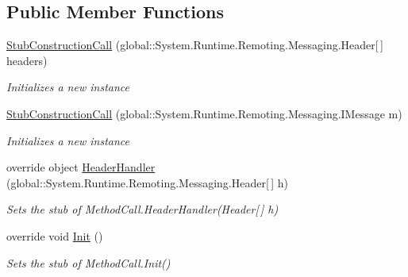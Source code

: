 \subsection*{Public Member Functions}
\begin{DoxyCompactItemize}
\item 
\hyperlink{class_system_1_1_runtime_1_1_remoting_1_1_messaging_1_1_fakes_1_1_stub_construction_call_a2eeccccc37f384931091f3d7a3b4d0d0}{Stub\-Construction\-Call} (global\-::\-System.\-Runtime.\-Remoting.\-Messaging.\-Header\mbox{[}$\,$\mbox{]} headers)
\begin{DoxyCompactList}\small\item\em Initializes a new instance\end{DoxyCompactList}\item 
\hyperlink{class_system_1_1_runtime_1_1_remoting_1_1_messaging_1_1_fakes_1_1_stub_construction_call_a7a16b830debff49f64697e7c4ea675eb}{Stub\-Construction\-Call} (global\-::\-System.\-Runtime.\-Remoting.\-Messaging.\-I\-Message m)
\begin{DoxyCompactList}\small\item\em Initializes a new instance\end{DoxyCompactList}\item 
override object \hyperlink{class_system_1_1_runtime_1_1_remoting_1_1_messaging_1_1_fakes_1_1_stub_construction_call_a9be0f7e358d1f5d52717ea6d96e05126}{Header\-Handler} (global\-::\-System.\-Runtime.\-Remoting.\-Messaging.\-Header\mbox{[}$\,$\mbox{]} h)
\begin{DoxyCompactList}\small\item\em Sets the stub of Method\-Call.\-Header\-Handler(\-Header\mbox{[}$\,$\mbox{]} h)\end{DoxyCompactList}\item 
override void \hyperlink{class_system_1_1_runtime_1_1_remoting_1_1_messaging_1_1_fakes_1_1_stub_construction_call_a52b79c8e5e0d79547a3cdf3d7222a023}{Init} ()
\begin{DoxyCompactList}\small\item\em Sets the stub of Method\-Call.\-Init()\end{DoxyCompactList}\end{DoxyCompactItemize}
